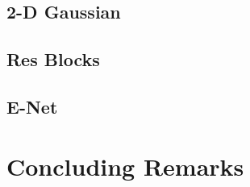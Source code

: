 \begin{spacing}{1.5}
\subsection{2-D Gaussian}
\label{subsec:IM_2D}

\subsection{Res Blocks}
\label{subsec:IM_resblock}

\subsection{E-Net}
\label{subsec:IM_Enet}



\section{Concluding Remarks}




\end{spacing}
\newpage
